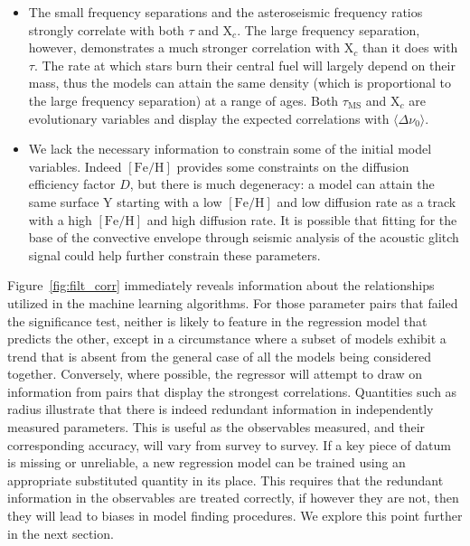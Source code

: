 \begin{itemize}
\item The small frequency separations and the asteroseismic frequency ratios strongly correlate with both $\tau$ and X$_c$. The large frequency separation, however, demonstrates a much stronger correlation with X$_c$ than it does with $\tau$. The rate at which stars burn their central fuel will largely depend on their mass, thus the 
models can attain the same density (which is proportional to the large frequency separation) at a range of ages. Both $\tau_{\text{MS}}$ and X$_c$ are evolutionary variables and display the expected correlations with ${\langle\Delta\nu_0\rangle}$. 

\item We lack the necessary information to constrain some of the initial model variables. Indeed ${[\text{Fe/H}]}$ provides some constraints on the diffusion efficiency factor $D$, but there is much degeneracy: a model can attain the same surface Y starting with a low ${[\text{Fe/H}]}$ and low diffusion rate as a track with a high ${[\text{Fe/H}]}$ and high diffusion rate. It is possible that fitting for the base of the convective envelope through seismic analysis of the acoustic glitch signal \citep{2014ApJ...782...18M, 2014ApJ...794..114V} could help further constrain these parameters. 


\end{itemize}

Figure~\ref{fig:filt_corr} immediately reveals information about the relationships utilized in the machine learning algorithms. 
For those parameter pairs that failed the significance test, neither is likely to feature in the regression model that predicts the other, except in a circumstance where a subset of models exhibit a trend that is absent from the general case of all the models being considered together.
Conversely, where possible, the regressor will attempt to draw on information from pairs that display the strongest correlations.
Quantities such as radius illustrate that there is indeed redundant information in independently measured parameters.
This is useful as the observables measured, and their corresponding accuracy, will vary from survey to survey. 
If a key piece of datum is missing or unreliable, a new regression model can be trained using an appropriate substituted quantity in its place.   
This requires that the redundant information in the observables are treated correctly, if however they are not, then they will lead to biases in model finding procedures. We explore this point further in the next section.  


